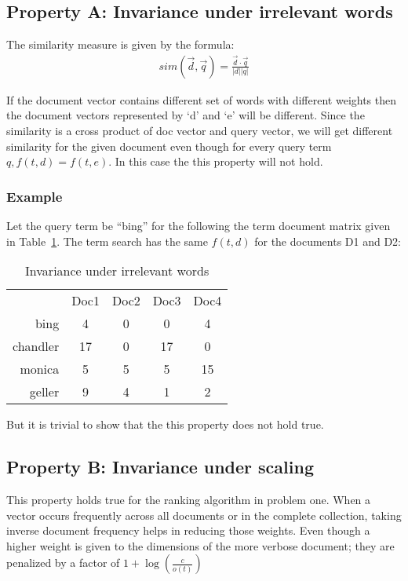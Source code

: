 \documentclass{article}
\begin{document}
\subsection{\textbf{Property A\@: Invariance under irrelevant words}}
The similarity measure is given by the formula:
\begin{align*}
  sim(\vec{d},\vec{q}) = \frac{\vec{d}\cdot\vec{q}}{\vert d \vert \vert q \vert}
\end{align*}

If the document vector contains different set of words with different weights then the document vectors represented by `d' and `e' will be different.
Since the similarity is a cross product of doc vector and query vector, we will get different similarity for the given document even though for every query term $q, f(t,d) = f(t,e) $.
In this case the this property will not hold.

\subsubsection{Example}
Let the query term be ``bing'' for the following the term document matrix given in Table~\ref{tab:inv}. The term search has the same $f(t,d)$ for the documents D1 and D2:

\begin{table}
  \caption{Invariance under irrelevant words \label{tab:inv}}
  \centering
\begin{tabular}{r c c c c}
  \multicolumn{1}{r}{}
   & \multicolumn{1}{c}{Doc1}
   & \multicolumn{1}{c}{Doc2}
   & \multicolumn{1}{c}{Doc3}
   & \multicolumn{1}{c}{Doc4} \\
  \cline{2-5}
  bing & 4 & 0 & 0 & 4 \\
  \cline{2-5}
  chandler & 17 & 0 & 17 & 0 \\
  \cline{2-5}
  monica & 5 & 5 & 5 & 15 \\
  \cline{2-5}
  geller & 9 & 4 & 1 & 2 \\
  \cline{2-5}
\end{tabular}
\end{table}
But it is trivial to show that the this property does not hold true.

\subsection{\textbf{Property B\@: Invariance under scaling}}
This property holds true for the ranking algorithm in problem one.
When a vector occurs frequently across all documents or in the complete collection, taking inverse document frequency helps in reducing those weights.
Even though a higher weight is given to the dimensions of the more verbose document; they are penalized by a factor of $1 + \log(\frac{c}{o(t)})$ 
\end{document}
